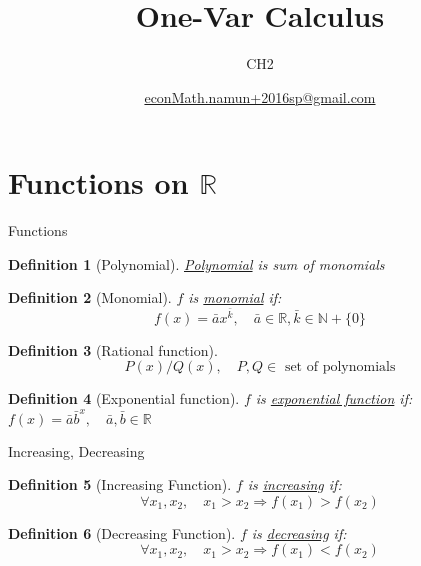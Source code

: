 \documentclass[a4paper,11pt]{article}
\author[조남운]{\url{econMath.namun+2016sp@gmail.com}}
\title{One-Var Calculus}
\subtitle{CH2}
\newtheorem{defn}{Definition}
\begin{document}
	\maketitle


\section{Functions on $\mathbb{R}$} %
\begin{frame}[t]{Functions}

	\begin{defn}[Polynomial]
		\uline{Polynomial} is sum of monomials
	\end{defn}
	
	\begin{defn}[Monomial]
		$f$ is \uline{monomial} if:
			\[
				f(x) = \bar a x^{\bar k},\quad \bar a \in \mathbb{R}, \bar k\in \mathbb{N}+\{0\}
			\]
	\end{defn}

	\begin{defn}
		[Rational function]
		\[
			P(x)/Q(x),\quad \text{$P,Q \in$ set of polynomials}
		\]
	\end{defn}
	
	\begin{defn}
		[Exponential function]
		$f$ is \uline{exponential function} if: $
			f(x) = \bar a {\bar b}^x,\quad \bar a, \bar b \in \mathbb{R}
		$
	\end{defn}

\end{frame}

\begin{frame}[t]{Increasing, Decreasing}
	\begin{defn}
		[Increasing Function]
		$f$ is \uline{increasing} if:\[
			\forall x_1,x_2, \quad x_1 >x_2 \Rightarrow f(x_1)>f(x_2)
		\]
	\end{defn}
	\begin{defn}
		[Decreasing Function]
		$f$ is \uline{decreasing} if:\[
			\forall x_1,x_2, \quad x_1 >x_2 \Rightarrow f(x_1)<f(x_2)
		\]
	\end{defn}
\end{frame}
\end{document}
